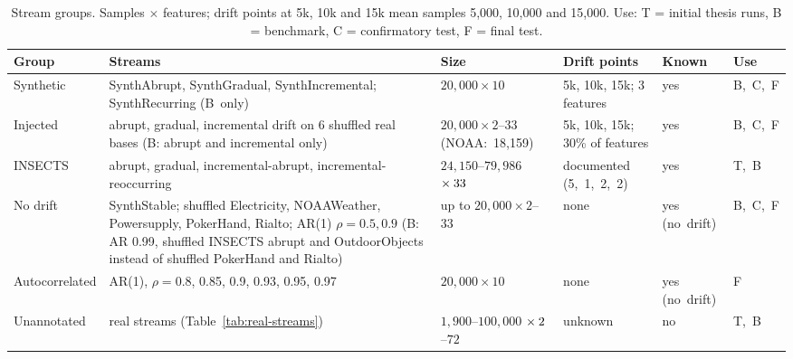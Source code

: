 \begin{table}[!htbp]
\centering
\caption[Stream groups]{Stream groups. Samples $\times$ features; drift points at 5k, 10k and 15k mean samples 5,000, 10,000 and 15,000. Use: T = initial thesis runs, B = benchmark, C = confirmatory test, F = final test.}
\label{tab:streams}
\small
\setlength{\tabcolsep}{4pt}
\begin{tabular}{>{\raggedright\arraybackslash}p{2.35cm}>{\raggedright\arraybackslash}p{3.2cm}>{\raggedright\arraybackslash}p{2.7cm}>{\raggedright\arraybackslash}p{2.1cm}>{\raggedright\arraybackslash}p{1.45cm}>{\raggedright\arraybackslash}p{1.15cm}}
\toprule
Group & Streams & Size & Drift points & Known & Use \\
\midrule
Synthetic & SynthAbrupt, SynthGradual, SynthIncremental; SynthRecurring \mbox{(B only)} & \mbox{$20{,}000 \times 10$} & 5k, 10k, 15k; 3 features & yes & \mbox{B, C, F} \\
\addlinespace
Injected & abrupt, gradual, incremental drift on 6 shuffled real bases (B: abrupt and incremental only) & \mbox{$20{,}000 \times 2$--$33$} \mbox{(NOAA: 18,159)} & 5k, 10k, 15k; 30\% of features & yes & \mbox{B, C, F} \\
\addlinespace
INSECTS & abrupt, gradual, incremental-abrupt, incremental-reoccurring & \mbox{$24{,}150$--$79{,}986$} \mbox{$\times\mskip\medmuskip 33$} & documented \mbox{(5, 1, 2, 2)} & yes & \mbox{T, B} \\
\addlinespace
No drift & SynthStable; shuffled Electricity, NOAAWeather, Powersupply, PokerHand, Rialto; AR(1) $\rho = 0.5, 0.9$ (B: AR 0.99, shuffled INSECTS abrupt and OutdoorObjects instead of shuffled PokerHand and Rialto) & up to \mbox{$20{,}000 \times 2$--$33$} & none & yes \mbox{(no drift)} & \mbox{B, C, F} \\
\addlinespace
Autocorrelated & AR(1), $\rho = 0.8$, 0.85, 0.9, 0.93, 0.95, 0.97 & \mbox{$20{,}000 \times 10$} & none & yes \mbox{(no drift)} & F \\
\addlinespace
Unannotated & 9 real streams (Table~\ref{tab:real-streams}) & \mbox{$1{,}900$--$100{,}000$} \mbox{$\times\mskip\medmuskip 2$--$72$} & unknown & no & \mbox{T, B} \\
\bottomrule
\end{tabular}
\end{table}

